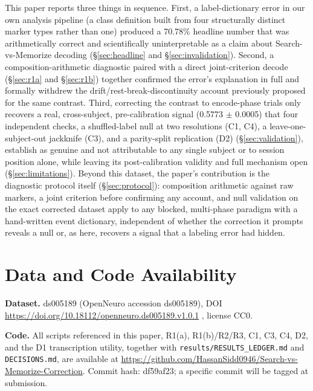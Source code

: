 \documentclass[preprint,12pt]{elsarticle}
\begin{document}
This paper reports three things in sequence. First, a label-dictionary error in our own analysis pipeline (a class definition built from four structurally distinct marker types rather than one) produced a 70.78\% headline number that was arithmetically correct and scientifically uninterpretable as a claim about Search-vs-Memorize decoding (\S\ref{sec:headline} and \S\ref{sec:invalidation}). Second, a composition-arithmetic diagnostic paired with a direct joint-criterion decode (\S\ref{sec:r1a} and \S\ref{sec:r1b}) together confirmed the error's explanation in full and formally withdrew the drift/rest-break-discontinuity account previously proposed for the same contrast. Third, correcting the contrast to encode-phase trials only recovers a real, cross-subject, pre-calibration signal (0.5773 $\pm$ 0.0005) that four independent checks, a shuffled-label null at two resolutions (C1, C4), a leave-one-subject-out jackknife (C3), and a parity-split replication (D2) (\S\ref{sec:validation}), establish as genuine and not attributable to any single subject or to session position alone, while leaving its post-calibration validity and full mechanism open (\S\ref{sec:limitations}). Beyond this dataset, the paper's contribution is the diagnostic protocol itself (\S\ref{sec:protocol}): composition arithmetic against raw markers, a joint criterion before confirming any account, and null validation on the exact corrected dataset apply to any blocked, multi-phase paradigm with a hand-written event dictionary, independent of whether the correction it prompts reveals a null or, as here, recovers a signal that a labeling error had hidden.

\section{Data and Code Availability}\label{sec:data}

\begin{sloppypar}\textbf{Dataset.} ds005189 (OpenNeuro accession ds005189), DOI \url{https://doi.org/10.18112/openneuro.ds005189.v1.0.1} \cite{markiewicz2021,gorgolewski2016}, license CC0.\end{sloppypar}

\textbf{Code.} All scripts referenced in this paper, R1(a), R1(b)/R2/R3, C1, C3, C4, D2, and the D1 transcription utility, together with \texttt{results/RESULTS\_LEDGER.md} and \texttt{DECISIONS.md}, are available at \url{https://github.com/HassanSidd0946/Search-vs-Memorize-Correction}. Commit hash: df59af23; a specific commit will be tagged at submission.
\end{document}
